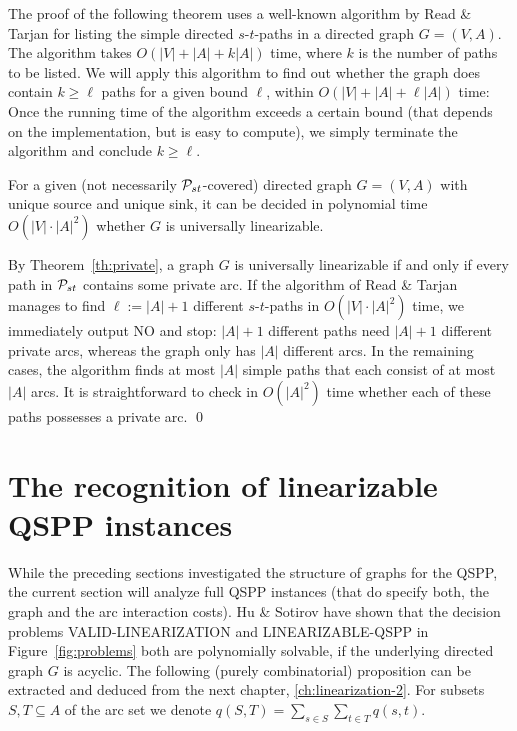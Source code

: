 \bigskip
The proof of the following theorem uses a well-known algorithm by Read \& Tarjan \cite{ReTa1975} 
for listing the simple directed $s$-$t$-paths in a directed graph $G=(V,A)$.
The algorithm takes $O(|V|+|A|+k|A|)$ time, where $k$ is the number of paths to be listed.
We will apply this algorithm to find out whether the graph does contain $k\ge\ell$ paths for
a given bound $\ell$, within $O(|V|+|A|+\ell|A|)$ time:
Once the running time of the algorithm exceeds a certain bound (that depends on the implementation,
but is easy to compute), we simply terminate the algorithm and conclude $k\ge\ell$.
\begin{theorem}
\label{th:algo}
For a given (not necessarily ${\cal P}_{st}$-covered) directed graph $G=(V,A)$ with unique source and 
unique sink, it can be decided in polynomial time $O(|V|\cdot|A|^2)$ 
whether $G$ is universally linearizable.
\end{theorem}
\proof
By Theorem~\ref{th:private}, a graph $G$ is universally linearizable if and only if 
every path in ${\cal P}_{st}$ contains some private arc.
If the algorithm of Read \& Tarjan \cite{ReTa1975} manages to find $\ell:=|A|+1$ different 
$s$-$t$-paths in $O(|V|\cdot|A|^2)$ time, we immediately output NO and stop: $|A|+1$ different 
paths need $|A|+1$ different private arcs, whereas the graph only has $|A|$ different arcs.
In the remaining cases, the algorithm finds at most $|A|$ simple paths that each consist of at most $|A|$ arcs.
It is straightforward to check in $O(|A|^2)$ time whether each of these paths possesses 
a private arc.
\qed


\medskip
\section{The recognition of linearizable QSPP instances}
\label{sec:hardness-chapter-4}
While the preceding sections investigated the structure of graphs for the QSPP, 
the current section will analyze full QSPP instances (that do specify both, the 
graph and the arc interaction costs).
Hu \& Sotirov \cite{huSo2021} have shown that the decision problems VALID-LI\-NEARI\-ZA\-TION
and LI\-NEA\-RIZABLE-QSPP in Figure~\ref{fig:problems} both are polynomially solvable, 
if the underlying directed graph $G$ is acyclic.
The following (purely combinatorial) proposition can be extracted and deduced from the next chapter, \cref{ch:linearization-2}.
For subsets $S,T\subseteq A$ of the arc set we denote $q(S,T)=\sum_{s\in S}\sum_{t\in T}q(s,t)$.

